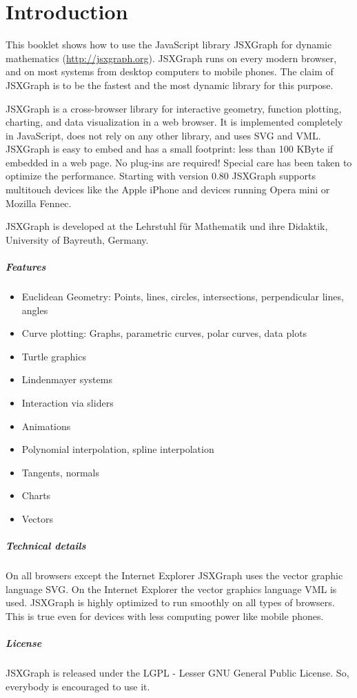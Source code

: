 \chapter*{Introduction}
This booklet shows how to use the JavaScript library JSXGraph for dynamic mathematics 
(\url{http://jsxgraph.org}).
JSXGraph runs on every modern browser, and on most systems from desktop computers to mobile phones.
The claim of JSXGraph is to be the fastest and the most dynamic library for this purpose.



JSXGraph is a cross-browser library for interactive geometry, function plotting, charting, and data visualization in a web browser. 
It is implemented completely in JavaScript, does not rely on any other library, and uses SVG and VML. 
JSXGraph is easy to embed and has a small footprint: 
less than 100 KByte if embedded in a web page. No plug-ins are required! Special care has been taken to optimize the performance. 
Starting with version 0.80 JSXGraph supports multitouch devices like the Apple iPhone and devices running 
Opera mini or Mozilla Fennec.

JSXGraph is developed at the Lehrstuhl f\"ur Mathematik und ihre Didaktik, University of Bayreuth, Germany.


\paragraph{Features}
\begin{itemize}
    \item Euclidean Geometry: Points, lines, circles, intersections, perpendicular lines, angles
    \item  Curve plotting: Graphs, parametric curves, polar curves, data plots
    \item  Turtle graphics
    \item  Lindenmayer systems
    \item  Interaction via sliders
    \item  Animations
    \item  Polynomial interpolation, spline interpolation
    \item  Tangents, normals
    \item  Charts
    \item  Vectors
\end{itemize}

\paragraph{Technical details}
On all browsers except the Internet Explorer JSXGraph uses the vector graphic language SVG. On the Internet Explorer
the vector graphics language VML is used. JSXGraph is highly optimized to run smoothly on all types of browsers. This is true even 
for devices with less computing power like mobile phones.



\paragraph{License}

JSXGraph is released under the LGPL - Lesser GNU General Public License. So, everybody is encouraged to use it.
